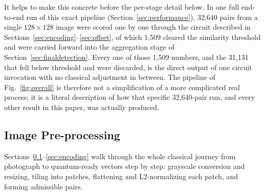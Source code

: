 \documentclass[conference]{IEEEtran}
\begin{document}
It helps to make this concrete before the per-stage detail below. In one full end-to-end run of this exact pipeline (Section~\ref{sec:performance}), 32,640 pairs from a single $128\times128$ image were scored one by one through the circuit described in Sections~\ref{sec:encoding}--\ref{sec:offset}, of which 1,509 cleared the similarity threshold and were carried forward into the aggregation stage of Section~\ref{sec:finaldetection}. Every one of those 1,509 numbers, and the 31,131 that fell below threshold and were discarded, is the direct output of one circuit invocation with no classical adjustment in between. The pipeline of Fig.~\ref{fig:overall} is therefore not a simplification of a more complicated real process; it is a literal description of how that specific 32,640-pair run, and every other result in this paper, was actually produced.

\subsection{Image Pre-processing}\label{sec:preprocessing}
Sections~\ref{sec:preprocessing}--\ref{sec:encoding} walk through the whole classical journey from photograph to quantum-ready vectors step by step: grayscale conversion and resizing, tiling into patches, flattening and L2-normalizing each patch, and forming admissible pairs.
\end{document}
